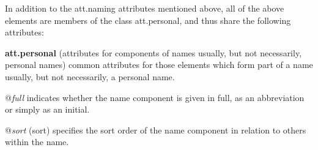 \par
In addition to the \textsf{att.naming} attributes mentioned above, all of the above elements are members of the class \textsf{att.personal}, and thus share the following attributes: 
\begin{sansreflist}
  
\item [\textbf{att.personal}] (attributes for components of names usually, but not necessarily, personal names) common attributes for those elements which form part of a name usually, but not necessarily, a personal name.\hfil\\[-10pt]\begin{sansreflist}
    \item[@{\itshape full}]
  indicates whether the name component is given in full, as an abbreviation or simply as an initial.
    \item[@{\itshape sort}]
  (sort) specifies the sort order of the name component in relation to others within the name.
\end{sansreflist}  
\end{sansreflist}
\par
